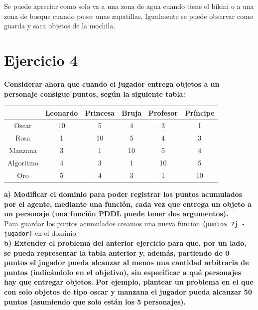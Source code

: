 \documentclass[12pt]{article}
\begin{document}
Se puede apreciar como solo va a una zona de agua cuando tiene el bikini o a una zona de bosque cuando posee unas zapatillas. Igualmente se puede observar como guarda y saca objetos de la mochila.

\section{Ejercicio 4} \textbf{Considerar ahora que cuando el jugador entrega objetos a un personaje consigue puntos, según la siguiente tabla:}

\begin{table}[H]
\centering
\begin{tabular}{c|c|c|c|c|c|}
\cline{2-6}
                                & Leonardo & Princesa & Bruja & Profesor & Príncipe \\ \hline
\multicolumn{1}{|c|}{Oscar}     & 10       & 5        & 4     & 3        & 1        \\ \hline
\multicolumn{1}{|c|}{Rosa}      & 1        & 10       & 5     & 4        & 3        \\ \hline
\multicolumn{1}{|c|}{Manzana}   & 3        & 1        & 10    & 5        & 4        \\ \hline
\multicolumn{1}{|c|}{Algoritmo} & 4        & 3        & 1     & 10       & 5        \\ \hline
\multicolumn{1}{|c|}{Oro}       & 5        & 4        & 3     & 1        & 10       \\ \hline
\end{tabular}
\end{table}

\textbf{a) Modificar el dominio para poder registrar los puntos acumulados por el agente, mediante una función, cada vez que entrega un objeto a un personaje (una función PDDL puede tener dos argumentos).}\\

Para guardar los puntos acumulados creamos una nueva función \texttt{(puntos ?j - jugador)} en el dominio.\\

\textbf{b) Extender el problema del anterior ejercicio para que, por un lado, se pueda representar la tabla anterior y, además, partiendo de 0 puntos el jugador pueda alcanzar al menos una cantidad arbitraria de puntos (indicándolo en el objetivo), sin especificar a qué personajes hay que entregar objetos. Por ejemplo, plantear un problema en el que con solo objetos de tipo oscar y manzana el jugador pueda alcanzar 50 puntos (asumiendo que solo están los 5 personajes).}\\
\end{document}
